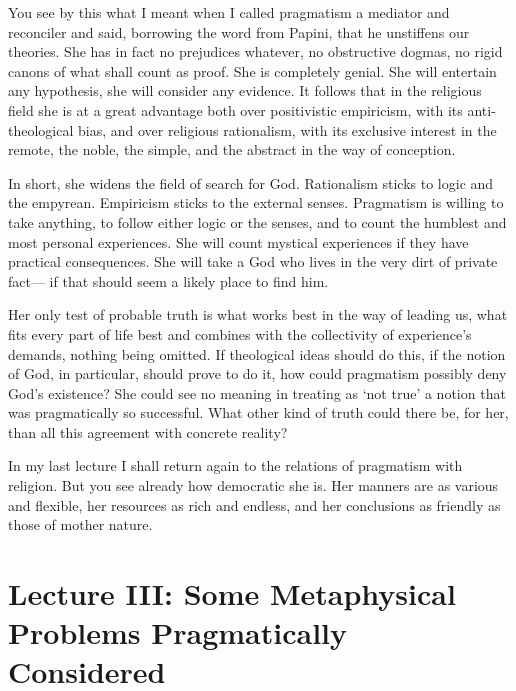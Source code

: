 \documentclass[]{article}
\begin{document}
You see by this what I meant when I called pragmatism a mediator and
reconciler and said, borrowing the word from Papini, that he unstiffens
our theories. She has in fact no prejudices whatever, no obstructive
dogmas, no rigid canons of what shall count as proof. She is completely
genial. She will entertain any hypothesis, she will consider any
evidence. It follows that in the religious field she is at a great
advantage both over positivistic empiricism, with its anti-theological
bias, and over religious rationalism, with its exclusive interest in
the remote, the noble, the simple, and the abstract in the way of
conception.

In short, she widens the field of search for God. Rationalism sticks
to logic and the empyrean. Empiricism sticks to the external senses.
Pragmatism is willing to take anything, to follow either logic or the
senses, and to count the humblest and most personal experiences. She
will count mystical experiences if they have practical consequences.
She will take a God who lives in the very dirt of private fact--- if that
should seem a likely place to find him.

Her only test of probable truth is what works best in the way of leading
us, what fits every part of life best and combines with the collectivity
of experience's demands, nothing being omitted. If theological ideas
should do this, if the notion of God, in particular, should prove to do
it, how could pragmatism possibly deny God's existence? She could see
no meaning in treating as `not true' a notion that was pragmatically so
successful. What other kind of truth could there be, for her, than all
this agreement with concrete reality?

In my last lecture I shall return again to the relations of pragmatism
with religion. But you see already how democratic she is. Her manners
are as various and flexible, her resources as rich and endless, and her
conclusions as friendly as those of mother nature.


\section*{Lecture III: Some Metaphysical Problems Pragmatically Considered}
\end{document}
